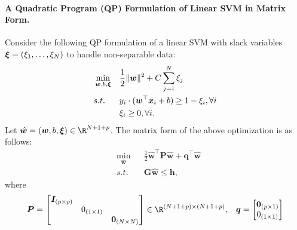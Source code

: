 {    \paragraph{A Quadratic Program (QP) Formulation of Linear SVM in Matrix Form.}
    Consider the following QP formulation of a linear SVM with slack variables $\bm{\xi} = (\xi_1, \ldots, \xi_N)$ to handle non-separable data: 
            \begin{equation}
                \begin{aligned}
                    & \min_{\bm{w}, b, \bm{\xi} } & & \frac{1}{2}\lVert\bm{w}\rVert^2  + C \sum_{j=1}^{N}{\xi_j} \\
                    & s.t.             & & y_i \cdot (\bm{w}^\top \bm{x}_i + b) \ge 1 - \xi_i, \forall i \\
                    &                  & & \xi_i \ge 0, \forall i.
                \end{aligned}
            \end{equation}
    Let $\hat{\bm{w}} = (\bm{w}, b, \bm{\xi}) \in \R^{\ndata + 1 + \nfeat}$.
    The matrix form of the above optimization is as follows:
            \begin{equation}
                \begin{aligned}
                    & \min_{ \hat{\bm{w}} } & & \frac{1}{2} \hat{\bm{w}}^\top \bm{P} \hat{\bm{w}}  + \bm{q}^\top \hat{\bm{w}}\\
                    & s.t.             & & \bm{G} \hat{\bm{w}} \le \bm{h},
                \end{aligned}
            \end{equation}
    where
        \begin{equation}
            \begin{aligned}
                & \bm{P} = \begin{bmatrix} 
                                \bm{I}_{(\nfeat \times \nfeat)} &  &  \\
                                 & 0_{(1 \times 1)} & \\
                                 & & \bm{0}_{(\ndata \times \ndata)}
                         \end{bmatrix} \in \R^{(\ndata + 1 + \nfeat) \times (\ndata + 1 + \nfeat)},
                & \bm{q} = \begin{bmatrix}
                    \bm{0}_{(\nfeat \times 1)}\\
                    0_{(1 \times 1)} \\

\end{bmatrix}
\end{aligned}
\end{equation}}
